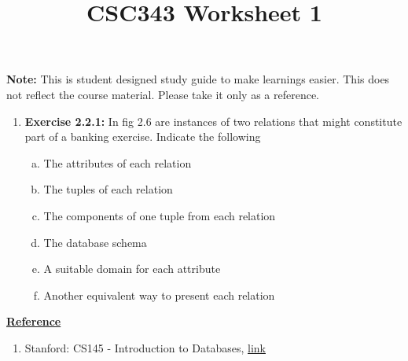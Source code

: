 \documentclass[12pt]{article}
\begin{document}
\title{CSC343 Worksheet 1}
\maketitle

\noindent \textbf{Note:} This is student designed study guide to make learnings easier.
This does not reflect the course material. Please take it only as a reference.

\begin{enumerate}[1.]
    \item \textbf{Exercise 2.2.1:} In fig 2.6 are instances of two relations that might
    constitute part of a banking exercise. Indicate the following

    \begin{enumerate}[a)]
        \item The attributes of each relation
        \item The tuples of each relation
        \item The components of one tuple from each relation
        \item The database schema
        \item A suitable domain for each attribute
        \item Another equivalent way to present each relation
    \end{enumerate}
\end{enumerate}


\bigskip

\underline{\textbf{Reference}}

\bigskip

\begin{enumerate}[1)]
    \item Stanford: CS145 - Introduction to Databases, \href{http://infolab.stanford.edu/~ullman/fcdb/aut07/index.html}{link}
\end{enumerate}
\end{document}
